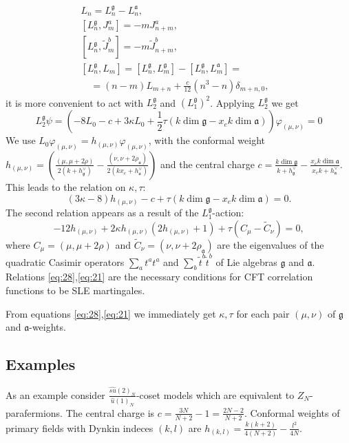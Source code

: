 \documentclass{jetpl}
\newcommand{\gf}{\mathfrak{g}}
\newcommand{\af}{\mathfrak{a}}
\begin{document}
\begin{equation}
  \label{eq:18}
\begin{array}{ll}
  L_{n}= L_{n}^{\gf}-L_{n}^{\af}, &\\
  \left[L_{n}^{\gf},J^{a}_{m}\right]= -m J^{a}_{n+m},&\\
  \left[L_{n}^{\gf},\tilde{J}^{b}_{m}\right]=-m\tilde{J}^{b}_{n+m},&\\
  \left[L_{n}^{\gf},L_{m}\right]=[L_{n}^{\gf},L_{m}^{\gf}]-[L_{n}^{\gf},L_{m}^{\af}]=&\\
  \quad =(n-m)L_{m+n}+\frac{c}{12}(n^{3}-n)\delta_{m+n,0},&
\end{array}
\end{equation}
 it is more convenient to act with $L_{2}^{\gf}$ and $\left(L_{1}^{\gf}\right)^{2}$. 
 Applying $L_{2}^{\gf}$ we get
\begin{equation*}
  L_{2}^{\gf}\psi= \left(-8 L_{0}-c+ 3 \kappa L_{0}+\frac{1}{2}\tau (k \dim\gf-x_{e}k\dim\af)\right) \varphi_{(\mu,\nu)}=0
\end{equation*}
We use $L_{0} \varphi_{(\mu,\nu)}=h_{(\mu,\nu)} \varphi_{(\mu,\nu)}$, with the conformal weight  $h_{(\mu,\nu)}= \left(\frac{(\mu,\mu+2\rho)}{2(k+h^{\vee}_{\gf})}-\frac{(\nu,\nu+2\rho_{\af})}{2(k x_{e}+h^{\vee}_{\af})}\right)$ and the central charge $c=\frac{k\dim \gf}{k+h^{\vee}_{\gf}}-\frac{x_{e}k\dim \af}{x_{e} k+h^{\vee}_{\af}}$. This leads to the relation on $\kappa,\tau$:
\begin{equation}
  \label{eq:28} (3\kappa-8)h_{(\mu,\nu)}-c+\tau (k\dim\gf-x_{e}k\dim\af) =0.
\end{equation}
The second relation appears as a result of the $L_{1}^{\gf}$-action:
\begin{equation}
  \label{eq:21}
 -12 h_{(\mu,\nu)}+2\kappa h_{(\mu,\nu)} (2h_{(\mu,\nu)}+1) + \tau
(C_{\mu}-\tilde{C}_{\nu})=0,
\end{equation}
 where $C_{\mu}=(\mu,\mu+2\rho)$ and $\tilde{C}_{\nu}=(\nu,\nu+2\rho_{\af})$ are the eigenvalues of the quadratic Casimir operators $\sum_{a}t^{a}t^{a}$ and $\sum_{b}\tilde{t}^{b}\tilde{t}^{b}$ of Lie algebras $\gf$ and $\af$.
Relations \eqref{eq:28},\eqref{eq:21} are the necessary conditions for CFT correlation functions to be SLE martingales. 

From equations \eqref{eq:28},\eqref{eq:21} we immediately get $\kappa,\tau$ for each pair $(\mu,\nu)$ of $\gf$ and $\af$-weights. 

\subsection{Examples}
\label{sec:examples-1}
As an example consider  $\frac{\hat{su}(2)_{N}}{\hat{u}(1)_{N}}$-coset models which are equivalent to $Z_{N}$-parafermions.  The central charge is $c=\frac{3N}{N+2}-1=\frac{2N-2}{N+2}$. Conformal weights of primary fields with Dynkin indeces $(k,l)$ are $h_{(k,l)}=\frac{k(k+2)}{4(N+2)}-\frac{l^{2}}{4N}$.
\end{document}
